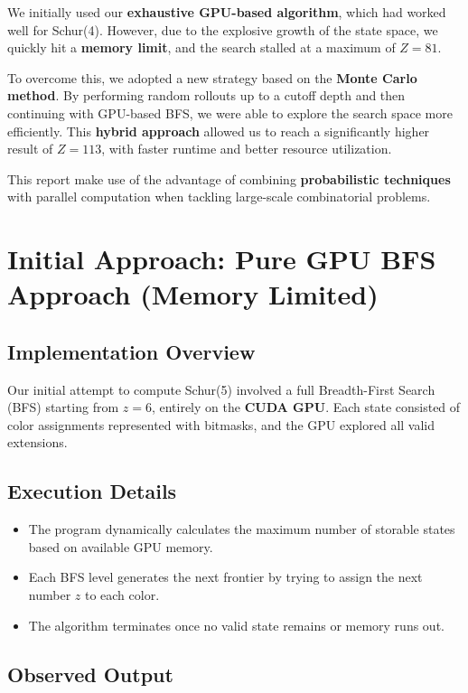 \documentclass[12pt]{article}
\begin{document}
We initially used our \textbf{exhaustive GPU-based algorithm}, which had worked well for Schur(4). However, due to the explosive growth of the state space, we quickly hit a \textbf{memory limit}, and the search stalled at a maximum of \boldmath$Z = 81$\unboldmath.

To overcome this, we adopted a new strategy based on the \textbf{Monte Carlo method}. By performing random rollouts up to a cutoff depth and then continuing with GPU-based BFS, we were able to explore the search space more efficiently. This \textbf{hybrid approach} allowed us to reach a significantly higher result of \boldmath$Z = 113$\unboldmath, with faster runtime and better resource utilization.

This report  make use of the  advantage of combining \textbf{probabilistic techniques} with parallel computation when tackling large-scale combinatorial problems.




\section{Initial Approach: \textbf{Pure GPU BFS Approach} (Memory Limited)}

\subsection*{Implementation Overview}
Our initial attempt to compute Schur(5) involved a full Breadth-First Search (BFS) starting from \( z = 6 \), entirely on the \textbf{CUDA GPU}. Each state consisted of color assignments represented with bitmasks, and the GPU explored all valid extensions.

\subsection*{Execution Details}
\begin{itemize}
    \item The program dynamically calculates the maximum number of storable states based on available GPU memory.
    \item Each BFS level generates the next frontier by trying to assign the next number \( z \) to each color.
    \item The algorithm terminates once no valid state remains or memory runs out.
\end{itemize}

\subsection*{Observed Output}
\end{document}
